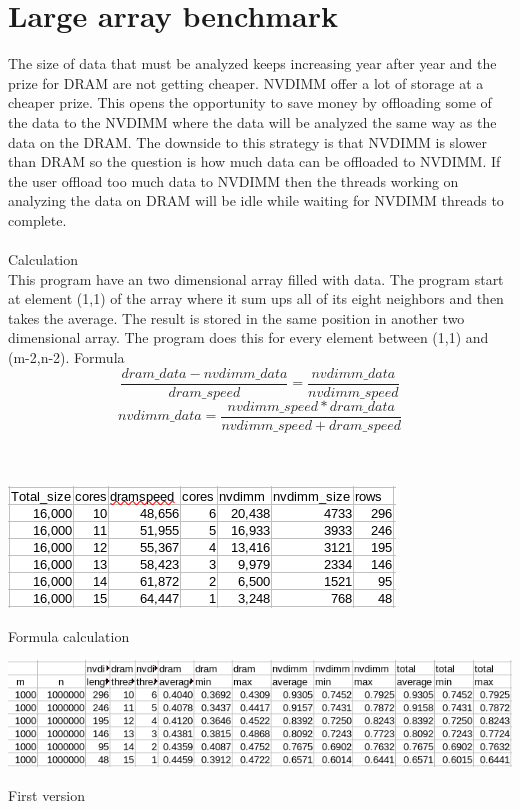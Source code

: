 \documentclass[12pt,a4paper,USenglish]{article}      %
\begin{document}
\clearpage
\section{Large array benchmark}
The size of data that must be analyzed keeps increasing year after year and the prize for DRAM are not getting cheaper. NVDIMM offer a lot of storage at a cheaper prize. This opens the opportunity to save money by offloading some of the data to the NVDIMM where the data will be analyzed the same way as the data on the DRAM. The downside to this strategy is that NVDIMM is slower than DRAM so the question is how much data can be offloaded to NVDIMM. If the user offload too much data to NVDIMM then the threads working on analyzing the data on DRAM will be idle while waiting for NVDIMM threads to complete.
\\
\\
Calculation\\
This program have an two dimensional array filled with data. The program start at element (1,1) of the array where it sum ups all of its eight neighbors and then takes the average. The result is stored in the same position in another two dimensional array. The program does this for every element between (1,1) and (m-2,n-2).
\clearpage
Formula
\[
    \frac{dram\_data-nvdimm\_data}{dram\_speed} = \frac{nvdimm\_data}{nvdimm\_speed}    
\]
\[
    nvdimm\_data = \frac{nvdimm\_speed*dram\_data}{nvdimm\_speed+dram\_speed}
\]
\\
\\
\begin{table}[!hbtp]
\includegraphics[scale=0.7]{Formula_calculation.png}
\caption{Formula calculation}
\end{table}

\begin{table}[!hbtp]
\includegraphics[scale=0.7]{Formula_First_version.png}
\caption{First version}
\end{table}
\end{document}
